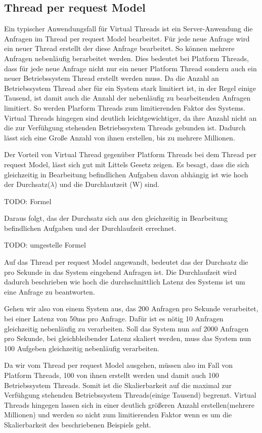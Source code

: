 \documentclass[fontsize=12pt,paper=a4,twoside=semi,parskip=half-,headsepline,headinclude]{scrreprt}
\begin{document}
\subsection{Thread per request Model}

Ein typischer Anwendungsfall für Virtual Threads ist ein Server-Anwendung die Anfragen im Thread per request Model bearbeitet. Für jede neue Anfrage wird ein neuer Thread erstellt der diese Anfrage bearbeitet. So können mehrere Anfragen nebenläufig berarbeitet werden. Dies bedeutet bei Platform Threads, dass für jede neue Anfrage nicht nur ein neuer Platform Thread sondern auch ein neuer Betriebssystem Thread erstellt werden muss. Da die Anzahl an Betriebssystem Thread aber für ein System stark limitiert ist, in der Regel einige Tausend, ist damit auch die Anzahl der nebenläufig zu bearbeitenden Anfragen limitiert. So werden Plarform Threads zum limitierenden Faktor des Systems. Virtual Threads hingegen sind deutlich leichtgewichtiger, da ihre Anzahl nicht an die zur Verfühgung stehenden Betriebssystem Threads gebunden ist. Dadurch lässt sich eine Große Anzahl von ihnen erstellen, bis zu mehrere Millionen.

Der Vorteil von Virtual Thread gegenüber Platform Threads bei dem Thread per request Model, lässt sich gut mit Littels Gesetz zeigen. Es besagt, dass die sich gleichzeitig in Bearbeitung befindlichen Aufgaben davon abhängig ist wie hoch der Durchsatz($\lambda$) und die Durchlautzeit (W) sind.

TODO: Formel

Daraus folgt, das der Durchsatz sich aus den gleichzeitig in Bearbeitung befindlichen Aufgaben und der Durchlaufzeit errechnet.

TODO: umgestelle Formel

Auf das Thread per request Model angewandt, bedeutet das der Durchsatz die pro Sekunde in das System eingehend Anfragen ist. Die Durchlaufzeit wird dadurch beschrieben wie hoch die durchschnittlich Latenz des Systems ist um eine Anfrage zu beantworten. 

Gehen wir also von einem System aus, das 200 Anfragen pro Sekunde verarbeitet, bei einer Latenz von 50ms pro Anfrage. Dafür ist es nötig 10 Anfragen gleichzeitig nebenläufig zu verarbeiten. Soll das System nun auf 2000 Anfragen pro Sekunde, bei gleichbleibender Latenz skaliert werden, muss das System nun 100  Aufgeben gleichzeitig nebenläufig verarbeiten.

Da wir vom Thread per request Model ausgehen, müssen also im Fall von  Platform Threads, 100 von ihnen erstellt werden und damit auch 100 Betriebssystem Threads. Somit ist die Skalierbarkeit auf die maximal zur Verfühgung stehenden Betriebssystem Threads(einige Tausend) begrenzt. Virtual Threads hingegen lassen sich in einer deutlich größeren Anzahl erstellen(mehrere Millionen) und werden so nicht zum limitierenden Faktor wenn es um die Skalierbarkeit des beschriebenen Beispiels geht.
\end{document}
